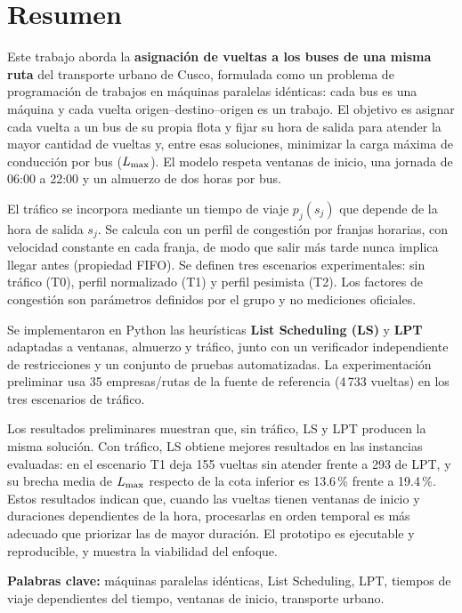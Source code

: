 \section*{Resumen}

Este trabajo aborda la \textbf{asignación de vueltas a los buses de una misma ruta} del transporte urbano de Cusco, formulada como un problema de programación de trabajos en máquinas paralelas idénticas: cada bus es una máquina y cada vuelta origen--destino--origen es un trabajo. El objetivo es asignar cada vuelta a un bus de su propia flota y fijar su hora de salida para atender la mayor cantidad de vueltas y, entre esas soluciones, minimizar la carga máxima de conducción por bus ($L_{\max}$). El modelo respeta ventanas de inicio, una jornada de 06:00 a 22:00 y un almuerzo de dos horas por bus.

El tráfico se incorpora mediante un tiempo de viaje $p_j(s_j)$ que depende de la hora de salida $s_j$. Se calcula con un perfil de congestión por franjas horarias, con velocidad constante en cada franja, de modo que salir más tarde nunca implica llegar antes (propiedad FIFO). Se definen tres escenarios experimentales: sin tráfico (T0), perfil normalizado (T1) y perfil pesimista (T2). Los factores de congestión son parámetros definidos por el grupo y no mediciones oficiales.

Se implementaron en Python las heurísticas \textbf{List Scheduling (LS)} y \textbf{LPT} adaptadas a ventanas, almuerzo y tráfico, junto con un verificador independiente de restricciones y un conjunto de pruebas automatizadas. La experimentación preliminar usa 35 empresas/rutas de la fuente de referencia (4\,733 vueltas) en los tres escenarios de tráfico.

Los resultados preliminares muestran que, sin tráfico, LS y LPT producen la misma solución. Con tráfico, LS obtiene mejores resultados en las instancias evaluadas: en el escenario T1 deja 155 vueltas sin atender frente a 293 de LPT, y su brecha media de $L_{\max}$ respecto de la cota inferior es 13.6\,\% frente a 19.4\,\%. Estos resultados indican que, cuando las vueltas tienen ventanas de inicio y duraciones dependientes de la hora, procesarlas en orden temporal es más adecuado que priorizar las de mayor duración. El prototipo es ejecutable y reproducible, y muestra la viabilidad del enfoque.

\textbf{Palabras clave:} máquinas paralelas idénticas, List Scheduling, LPT, tiempos de viaje dependientes del tiempo, ventanas de inicio, transporte urbano.
\clearpage
